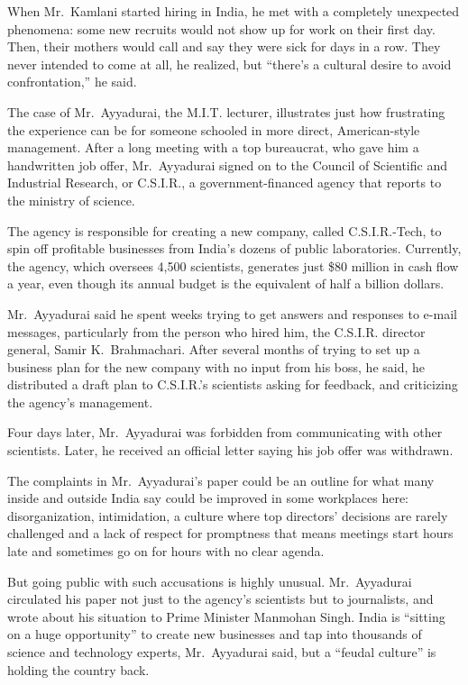 ﻿\documentclass[12pt]{article}
\begin{document}
When Mr.~Kamlani started hiring in India, he met with a completely unexpected phenomena: some new
recruits would not show up for work on their first day. Then, their mothers would call and say they
were sick for days in a row. They never intended to come at all, he realized, but ``there's a
cultural desire to avoid confrontation,'' he said.

The case of Mr.~Ayyadurai, the M.I.T. lecturer, illustrates just how frustrating the experience can
be for someone schooled in more direct, American-style management. After a long meeting with a top
bureaucrat, who gave him a handwritten job offer, Mr.~Ayyadurai signed on to the Council of
Scientific and Industrial Research, or C.S.I.R., a government-financed agency that reports to the
ministry of science.

The agency is responsible for creating a new company, called C.S.I.R.-Tech, to spin off profitable
businesses from India's dozens of public laboratories. Currently, the agency, which oversees 4,500
scientists, generates just \$80 million in cash flow a year, even though its annual budget is the
equivalent of half a billion dollars.

Mr.~Ayyadurai said he spent weeks trying to get answers and responses to e-mail messages,
particularly from the person who hired him, the C.S.I.R. director general, Samir K.~Brahmachari.
After several months of trying to set up a business plan for the new company with no input from his
boss, he said, he distributed a draft plan to C.S.I.R.'s scientists asking for feedback, and
criticizing the agency's management.

Four days later, Mr.~Ayyadurai was forbidden from communicating with other scientists. Later, he
received an official letter saying his job offer was withdrawn.

The complaints in Mr.~Ayyadurai's paper could be an outline for what many inside and outside India
say could be improved in some workplaces here: disorganization, intimidation, a culture where top
directors' decisions are rarely challenged and a lack of respect for promptness that means meetings
start hours late and sometimes go on for hours with no clear agenda.

But going public with such accusations is highly unusual. Mr.~Ayyadurai circulated his paper not
just to the agency's scientists but to journalists, and wrote about his situation to Prime Minister
Manmohan Singh. India is ``sitting on a huge opportunity'' to create new businesses and tap into
thousands of science and technology experts, Mr.~Ayyadurai said, but a ``feudal culture'' is holding
the country back.
\end{document}
